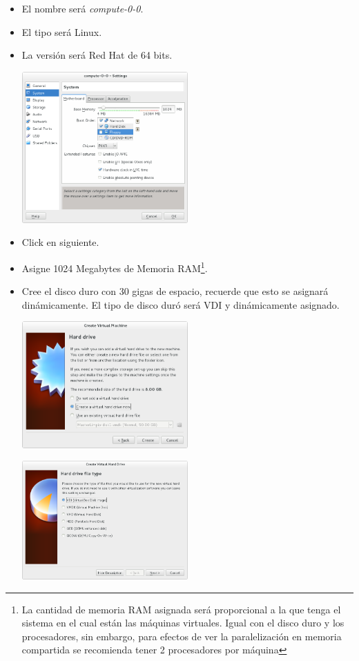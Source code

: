 \begin{enumerate}
\begin{itemize}
	\item El nombre será \textit{compute-0-0}.

	\item El tipo será Linux.

	\item La versión será Red Hat de 64 bits.
	
	\includegraphics[width=0.5\textwidth]{aux/nodoopsboot}

	\item Click en siguiente.

	\item Asigne 1024 Megabytes de Memoria RAM\footnote{La cantidad de memoria RAM asignada será proporcional a la que tenga el sistema en el cual están las máquinas virtuales. Igual con el disco duro y los procesadores, sin embargo, para efectos de ver la paralelización en memoria compartida se recomienda tener 2 procesadores por máquina}.

	\item Cree el disco duro con 30 gigas de espacio, recuerde que esto se asignará dinámicamente. El tipo de disco duró será VDI y dinámicamente asignado.



	\includegraphics[width=0.5\textwidth]{aux/nodohd}

	
	\includegraphics[width=0.5\textwidth]{aux/nododvi}



\end{itemize}
\end{enumerate}
